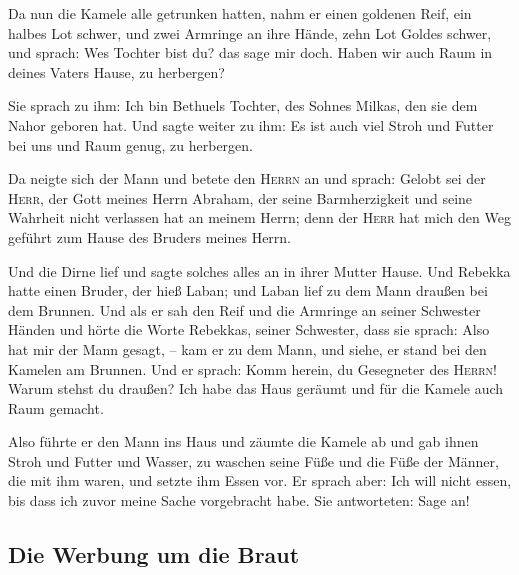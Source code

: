  Da nun die Kamele alle getrunken hatten, nahm er einen
goldenen Reif, ein halbes Lot schwer, und zwei Armringe an ihre Hände,
zehn Lot Goldes schwer,  und sprach: Wes Tochter bist du?
das sage mir doch. Haben wir auch Raum in deines Vaters Hause, zu
herbergen?

 Sie sprach zu ihm: Ich bin Bethuels Tochter, des Sohnes
Milkas, den sie dem Nahor geboren hat.  Und sagte weiter
zu ihm: Es ist auch viel Stroh und Futter bei uns und Raum genug, zu
herbergen.

 Da neigte sich der Mann und betete den \textsc{Herrn} an
 und sprach: Gelobt sei der \textsc{Herr}, der Gott
meines Herrn Abraham, der seine Barmherzigkeit und seine Wahrheit nicht
verlassen hat an meinem Herrn; denn der \textsc{Herr} hat mich den Weg
geführt zum Hause des Bruders meines Herrn.

 Und die Dirne lief und sagte solches alles an in ihrer
Mutter Hause.  Und Rebekka hatte einen Bruder, der hieß
Laban; und Laban lief zu dem Mann draußen bei dem Brunnen.
 Und als er sah den Reif und die Armringe an seiner
Schwester Händen und hörte die Worte Rebekkas, seiner Schwester, dass
sie sprach: Also hat mir der Mann gesagt, -- kam er zu dem Mann, und
siehe, er stand bei den Kamelen am Brunnen.  Und er
sprach: Komm herein, du Gesegneter des \textsc{Herrn}! Warum stehst du
draußen? Ich habe das Haus geräumt und für die Kamele auch Raum gemacht.

 Also führte er den Mann ins Haus und zäumte die Kamele
ab und gab ihnen Stroh und Futter und Wasser, zu waschen seine Füße und
die Füße der Männer, die mit ihm waren,  und setzte ihm
Essen vor. Er sprach aber: Ich will nicht essen, bis dass ich zuvor
meine Sache vorgebracht habe. Sie antworteten: Sage an!

\hypertarget{die-werbung-um-die-braut}{%
\subsection{Die Werbung um die Braut}\label{die-werbung-um-die-braut}}

